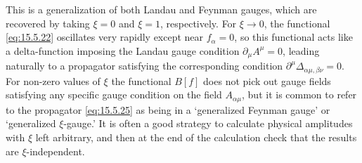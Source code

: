 This is a generalization of both Landau and Feynman gauges, which are
recovered by taking $\xi=0$ and $\xi=1$, respectively. For $\xi\to0$, the
functional \eqref{eq:15.5.22} oscillates very rapidly except near $f_\alpha=0$,
so this functional acts like a delta-function imposing the Landau gauge
condition $\partial_\mu A^\mu=0$, leading naturally to a propagator satisfying
the corresponding condition $\partial^\mu\Delta_{\alpha\mu,\beta\nu}=0$. For
non-zero values of $\xi$ the functional $B[f]$ does not pick out gauge fields
satisfying any specific gauge condition on the field $A_{\alpha\mu}$, but it is
common to refer to the propagator \eqref{eq:15.5.25} as being in a `generalized
Feynman gauge' or `generalized $\xi$-gauge.' It is often a good strategy to
calculate physical amplitudes with $\xi$ left arbitrary, and then at the end of
the calculation check that the results are $\xi$-independent.

